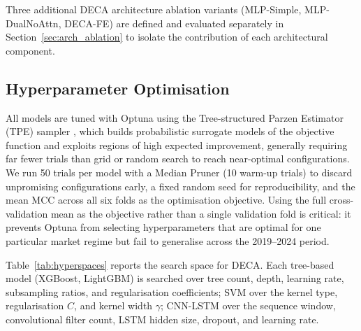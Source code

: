 \documentclass[final,3p,times,authoryear]{elsarticle}
\begin{document}
\noindent Three additional DECA architecture ablation variants
(MLP-Simple, MLP-DualNoAttn, DECA-FE) are defined and evaluated
separately in Section~\ref{sec:arch_ablation} to isolate the
contribution of each architectural component.

\subsection{Hyperparameter Optimisation}
\label{sec:hyper}

All models are tuned with Optuna \citep{akiba2019optuna} using the
Tree-structured Parzen Estimator (TPE) sampler \citep{bergstra2011tpe},
which builds probabilistic surrogate models of the objective function
and exploits regions of high expected improvement, generally requiring
far fewer trials than grid or random search to reach near-optimal
configurations.
We run 50 trials per model with a Median Pruner (10 warm-up trials) to
discard unpromising configurations early, a fixed random seed for
reproducibility, and the mean MCC across all six folds as the
optimisation objective.
Using the full cross-validation mean as the objective rather than a
single validation fold is critical: it prevents Optuna from selecting
hyperparameters that are optimal for one particular market regime
but fail to generalise across the 2019--2024 period.

Table~\ref{tab:hyperspaces} reports the search space for DECA.
Each tree-based model (XGBoost, LightGBM) is searched over tree count,
depth, learning rate, subsampling ratios, and regularisation
coefficients; SVM over the kernel type, regularisation $C$, and kernel
width $\gamma$; CNN-LSTM over the sequence window, convolutional filter
count, LSTM hidden size, dropout, and learning rate.
\end{document}
